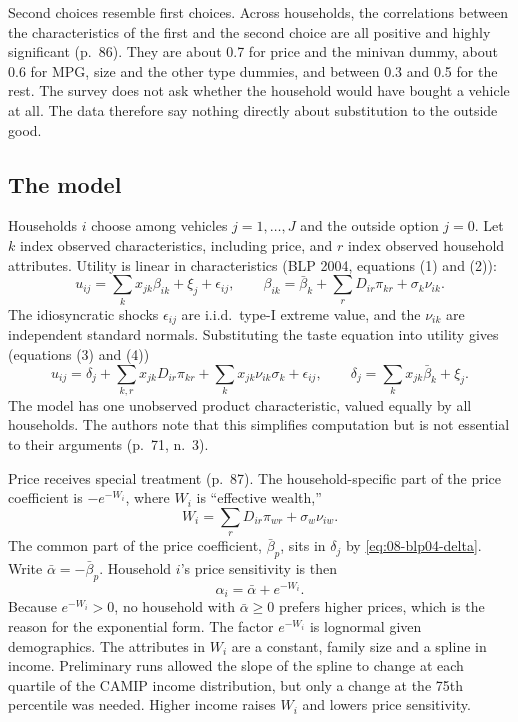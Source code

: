 Second choices resemble first choices. Across households, the correlations between the characteristics of the
first and the second choice are all positive and highly significant (p.~86). They are about 0.7 for price and
the minivan dummy, about 0.6 for MPG, size and the other type dummies, and between 0.3 and 0.5 for the rest.
The survey does not ask whether the household would have bought a vehicle at all. The data therefore say
nothing directly about substitution to the outside good.

\subsection{The model}\label{sec:08-blp04-model}

Households $i$ choose among vehicles $j = 1,\dots,J$ and the outside option $j = 0$. Let $k$ index observed
characteristics, including price, and $r$ index observed household attributes. Utility is linear in
characteristics (BLP 2004, equations (1) and (2)):
\begin{equation}\label{eq:08-blp04-utility}
u_{ij} = \sum_k x_{jk}\beta_{ik} + \xi_j + \epsilon_{ij},
\qquad
\beta_{ik} = \bar\beta_k + \sum_r D_{ir}\pi_{kr} + \sigma_k\nu_{ik} .
\end{equation}
The idiosyncratic shocks $\epsilon_{ij}$ are i.i.d.\ type-I extreme value, and the $\nu_{ik}$ are independent
standard normals. Substituting the taste equation into utility gives (equations (3) and (4))
\begin{equation}\label{eq:08-blp04-delta}
u_{ij} = \delta_j + \sum_{k,r} x_{jk}D_{ir}\pi_{kr} + \sum_k x_{jk}\nu_{ik}\sigma_k + \epsilon_{ij},
\qquad
\delta_j = \sum_k x_{jk}\bar\beta_k + \xi_j .
\end{equation}
The model has one unobserved product characteristic, valued equally by all households. The authors note that
this simplifies computation but is not essential to their arguments (p.~71, n.~3).

 Price receives special treatment (p.~87). The household-specific part of the
price coefficient is $-e^{-W_i}$, where $W_i$ is ``effective wealth,''
\begin{equation}\label{eq:08-blp04-wealth}
W_i = \sum_r D_{ir}\pi_{wr} + \sigma_w\nu_{iw} .
\end{equation}
The common part of the price coefficient, $\bar\beta_p$, sits in $\delta_j$ by \cref{eq:08-blp04-delta}.
Write $\bar\alpha = -\bar\beta_p$. Household $i$'s price sensitivity is then
\begin{equation}\label{eq:08-blp04-alpha}
\alpha_i = \bar\alpha + e^{-W_i}.
\end{equation}
Because $e^{-W_i} > 0$, no household with $\bar\alpha \geq 0$ prefers higher prices, which is the reason for the
exponential form. The factor $e^{-W_i}$ is lognormal given demographics. The attributes in $W_i$ are a constant,
family size and a spline in income. Preliminary runs allowed the slope of the spline to change at each quartile
of the CAMIP income distribution, but only a change at the 75th percentile was needed. Higher income raises
$W_i$ and lowers price sensitivity.

